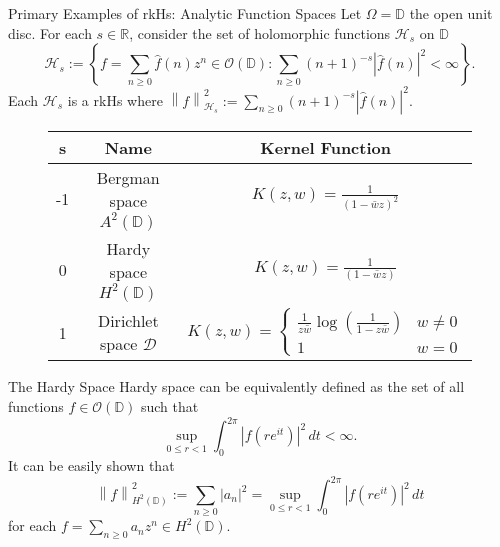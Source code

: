 \documentclass{beamer}
\newcommand{\R}{\mathbb R}
\newcommand{\D}{\mathbb D}
\newcommand{\calD}{{\mathcal D}}
\newcommand{\calH}{{\mathcal H}}
\newcommand{\calO}{{\mathcal O}}
\newcommand{\norm}[1]{\left\lVert #1 \right\rVert}
\newcommand{\abs}[1]{\left\lvert #1 \right\rvert}
\begin{document}
\begin{frame}{Primary Examples of rkHs: Analytic Function Spaces}
Let $\Omega = \D$ the open unit disc. For each $s\in \R$, consider the set of holomorphic functions $\calH _{s}$ on $\D$
\begin{equation}
\calH _{s} := \left\{ f=\sum_{n \ge 0} \hat{f}\left( n \right) z^{n} \in \calO \left( \D \right) : \sum_{n\ge 0} \left( n+1 \right)^{-s}\abs{\hat{f}(n)}^{2}  < \infty \right\}.
\end{equation}
Each $\calH_{s}$ is a rkHs where $\norm{f}_{\calH_{s}}^{2} := \sum_{n\ge 0} \left( n+1 \right)^{-s}\abs{\hat{f}(n)}^{2}$.
\pause
\begin{figure}
\begin{tabular}{ | c | c c | } 
\hline
 s & Name & Kernel Function \\ 
 \hline
 -1 & Bergman space $A^{2} \left( \D \right)$ & $ K(z,w) = \frac{1}{\left( 1-\bar{w}z \right)^{2}}$ \\
 0 & Hardy space $H^{2} \left( \D \right)$ & $ K(z,w) = \frac{1}{\left( 1-\bar{w}z \right)}$ \\ 
 1 & Dirichlet space $\calD$ & $K(z,w) = \begin{cases} \frac{1}{z\bar{w}} \log \left( \frac{1}{1-z\bar{w}} \right) & w \ne 0 \\ 1 & w= 0 \end{cases}$ \\
 \hline 
\end{tabular}
\end{figure}
\end{frame}
\begin{frame}{The Hardy Space}
Hardy space can be equivalently defined as the set of all functions $f \in \calO \left( \D \right)$ such that 
\begin{equation*}
\sup_{0\le r < 1} \int_{0}^{2\pi} \abs{f\left( re^{it} \right)}^{2} \, dt < \infty.
\end{equation*}
\pause
It can be easily shown that
\begin{equation*}
\norm{f}_{H^{2} \left( \D \right)} ^{2} := \sum_{n\ge 0} \abs{a_{n}}^{2} = \sup_{0\le r < 1} \int_{0}^{2\pi} \abs{f\left( re^{it} \right)}^{2} \, dt
\end{equation*}
for each $f= \sum_{n\ge 0} a_{n} z^{n} \in H^{2} \left( \D \right)$.
\end{frame}
\end{document}

